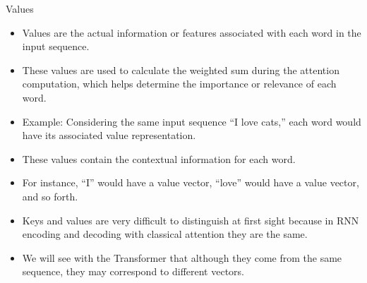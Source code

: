 \documentclass[handout]{beamer}
\begin{document}
\begin{frame}{Values}



\begin{scriptsize}
\begin{itemize}
\item Values are the actual information or features associated with each word in the input sequence.
\item These values are used to calculate the weighted sum during the attention computation, which helps determine the importance or relevance of each word.
\item Example: Considering the same input sequence ``I love cats,'' each word would have its associated value representation.
\item These values contain the contextual information for each word.
\item For instance, ``I'' would have a value vector, ``love'' would have a value vector, and so forth.
\item Keys and values are very difficult to distinguish at first sight because in RNN encoding and decoding with classical attention they are the same.
\item We will see with the Transformer that although they come from the same sequence, they may correspond to different vectors.

\end{itemize}

\end{scriptsize}

\end{frame}
\end{document}
